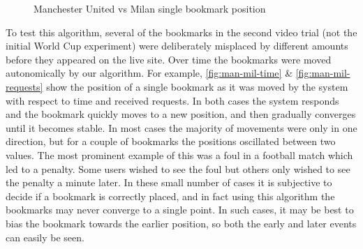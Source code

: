 

\begin{figure}[t]
    \centering


    \caption{Manchester United vs Milan single bookmark position}
    \label{fig:man-mil}
\end{figure}

To test this algorithm, several of the bookmarks in the second video trial (not the initial World Cup experiment) were deliberately misplaced by different amounts before they appeared on the live site. Over time the bookmarks were moved autonomically by our algorithm. For example, \autoref{fig:man-mil-time} \& \autoref{fig:man-mil-requests} show the position of a single bookmark as it was moved by the system with respect to time and received requests. In both cases the system responds and the bookmark quickly moves to a new position, and then gradually converges until it becomes stable. In most cases the majority of movements were only in one direction, but for a couple of bookmarks the positions oscillated between two values. The most prominent example of this was a foul in a football match which led to a penalty. Some users wished to see the foul but others only wished to see the penalty a minute later. In these small number of cases it is subjective to decide if a bookmark is correctly placed, and in fact using this algorithm the bookmarks may never converge to a single point. In such cases, it may be best to bias the bookmark towards the earlier position, so both the early and later events can easily be seen.

